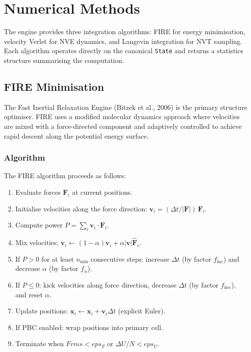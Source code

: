 \documentclass[11pt,twoside]{article}
\def\varepsilon{eps}%
\def\Frms{Frms}%
\newcommand{\Frms}{F_{\mathrm{rms}}}
\newcommand{\type}[1]{\texttt{#1}}
\begin{document}
\section{Numerical Methods}
\label{sec:numerical}

The engine provides three integration algorithms: FIRE for energy minimisation, velocity Verlet for NVE dynamics, and Langevin integration for NVT sampling. Each algorithm operates directly on the canonical \type{State} and returns a statistics structure summarising the computation.

\subsection{FIRE Minimisation}

The Fast Inertial Relaxation Engine (Bitzek et al., 2006) is the primary structure optimiser. FIRE uses a modified molecular dynamics approach where velocities are mixed with a force-directed component and adaptively controlled to achieve rapid descent along the potential energy surface.

\subsubsection{Algorithm}

The FIRE algorithm proceeds as follows:

\begin{enumerate}
  \item Evaluate forces $\mathbf{F}_i$ at current positions.
  \item Initialise velocities along the force direction: $\mathbf{v}_i = (\Delta t / |\mathbf{F}|)\, \mathbf{F}_i$.
  \item Compute power $P = \sum_i \mathbf{v}_i \cdot \mathbf{F}_i$.
  \item Mix velocities: $\mathbf{v}_i \leftarrow (1-\alpha)\mathbf{v}_i + \alpha |\mathbf{v}| \hat{\mathbf{F}}_i$.
  \item If $P > 0$ for at least $n_{\min}$ consecutive steps: increase $\Delta t$ (by factor $f_{\mathrm{inc}}$) and decrease $\alpha$ (by factor $f_\alpha$).
  \item If $P \leq 0$: kick velocities along force direction, decrease $\Delta t$ (by factor $f_{\mathrm{dec}}$), and reset $\alpha$.
  \item Update positions: $\mathbf{x}_i \leftarrow \mathbf{x}_i + \mathbf{v}_i \Delta t$ (explicit Euler).
  \item If PBC enabled: wrap positions into primary cell.
  \item Terminate when $\Frms < \varepsilon_F$ or $\Delta U / N < \varepsilon_U$.
\end{enumerate}
\end{document}

